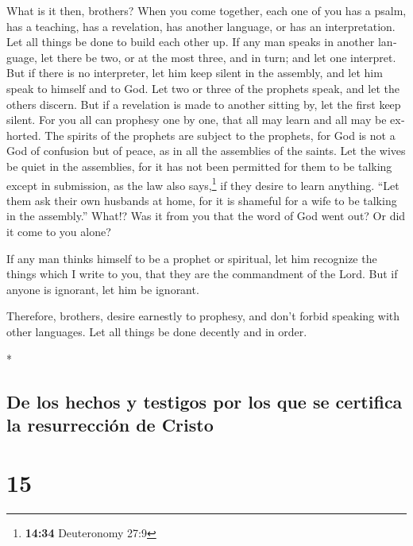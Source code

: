 \begin{paracol}{2}
\begin{otherlanguage}{english}
 What is it then, brothers? When you come together, each
one of you has a psalm, has a teaching, has a revelation, has another
language, or has an interpretation. Let all things be done to build each
other up.  If any man speaks in another language, let
there be two, or at the most three, and in turn; and let one interpret.
 But if there is no interpreter, let him keep silent in
the assembly, and let him speak to himself and to God. 
Let two or three of the prophets speak, and let the others discern.
 But if a revelation is made to another sitting by, let
the first keep silent.  For you all can prophesy one by
one, that all may learn and all may be exhorted.  The
spirits of the prophets are subject to the prophets,  for
God is not a God of confusion but of peace, as in all the assemblies of
the saints.  Let the wives be quiet in the assemblies,
for it has not been permitted for them to be talking except in
submission, as the law also says,\footnote{\textbf{14:34} Deuteronomy
  27:9}  if they desire to learn anything. ``Let them ask
their own husbands at home, for it is shameful for a wife to be talking
in the assembly.''  What!? Was it from you that the word
of God went out? Or did it come to you alone?

 If any man thinks himself to be a prophet or spiritual,
let him recognize the things which I write to you, that they are the
commandment of the Lord.  But if anyone is ignorant, let
him be ignorant.

 Therefore, brothers, desire earnestly to prophesy, and
don't forbid speaking with other languages.  Let all
things be done decently and in order.

\end{otherlanguage}

\switchcolumn[0]*

\hypertarget{de-los-hechos-y-testigos-por-los-que-se-certifica-la-resurrecciuxf3n-de-cristo}{%
\subsection{De los hechos y testigos por los que se certifica la
resurrección de
Cristo}\label{de-los-hechos-y-testigos-por-los-que-se-certifica-la-resurrecciuxf3n-de-cristo}}

\hypertarget{section-28}{%
\section{15}\label{section-28}}


\end{paracol}

